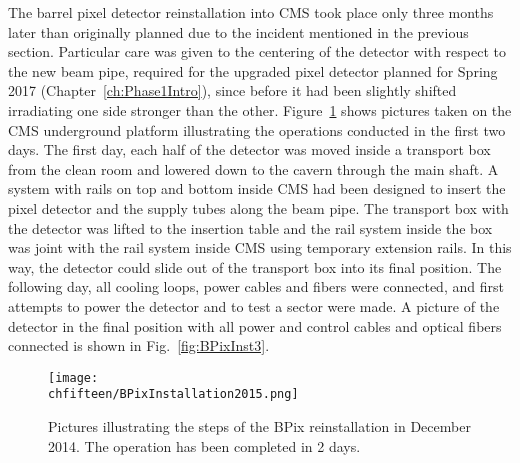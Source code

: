 The barrel pixel detector reinstallation into CMS took place only three months later than originally planned due to the incident mentioned in the previous section. 
Particular care was given to the centering of the detector with respect to the new beam pipe, required for the upgraded pixel detector planned for Spring 2017 (Chapter~\ref{ch:Phase1Intro}),
since before it had been slightly shifted irradiating one side stronger than the other.
Figure~\ref{fig:BPixInst2} shows pictures taken on the CMS underground platform illustrating the operations conducted in the first two days.
The first day, each half of the detector was moved inside a transport box from the clean room and lowered down to the cavern through the main shaft.
A system with rails on top and bottom inside CMS had been designed to insert the pixel detector and the supply tubes along the beam pipe.
The transport box with the detector was lifted to the insertion table and the rail system inside the box was joint with the rail system inside CMS using temporary extension rails.
In this way, the detector could slide out of the transport box into its final position.
The following day, all cooling loops, power cables and fibers were connected, and first attempts to power the detector and to test a sector were made.
A picture of the detector in the final position with all power and control cables and optical fibers connected is shown in Fig.~\ref{fig:BPixInst3}.

\begin{figure}[!htb]
 \begin{center}
 \texttt{[image: \\chfifteen/BPixInstallation2015.png]}
 \end{center}
 \caption{Pictures illustrating the steps of the BPix reinstallation in December 2014. The operation has been completed in 2 days.}
 \label{fig:BPixInst2}
\end{figure}

